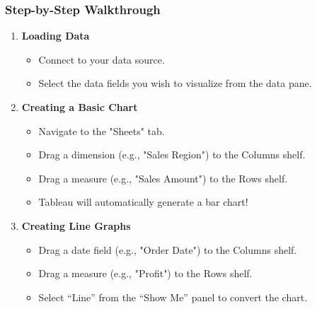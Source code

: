 \documentclass[aspectratio=169]{beamer}
\begin{document}
\begin{frame}[fragile]
    \frametitle{Step-by-Step Walkthrough}
    \begin{enumerate}
        \item \textbf{Loading Data}
        \begin{itemize}
            \item Connect to your data source.
            \item Select the data fields you wish to visualize from the data pane.
        \end{itemize}
        
        \item \textbf{Creating a Basic Chart}
        \begin{itemize}
            \item Navigate to the "Sheets" tab.
            \item Drag a dimension (e.g., "Sales Region") to the Columns shelf.
            \item Drag a measure (e.g., "Sales Amount") to the Rows shelf.
            \item Tableau will automatically generate a bar chart! 
        \end{itemize}
        
        \item \textbf{Creating Line Graphs}
        \begin{itemize}
            \item Drag a date field (e.g., "Order Date") to the Columns shelf.
            \item Drag a measure (e.g., "Profit") to the Rows shelf.
            \item Select “Line” from the “Show Me” panel to convert the chart.
        \end{itemize}
    \end{enumerate}
\end{frame}
\end{document}
